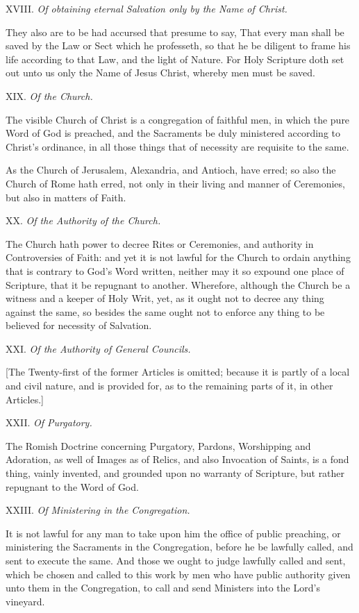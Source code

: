 XVIII.
\emph{Of obtaining eternal Salvation only by the Name of Christ.}

They
also are to be had accursed that presume to say, That every man shall
be saved by the Law or Sect which he professeth, so that he be diligent
to frame his life according to that Law, and the light of Nature. For
Holy Scripture doth set out unto us only the Name of Jesus Christ, whereby
men must be saved.

XIX. \emph{Of the Church.}

The
visible Church of Christ is a congregation of faithful men, in which the
pure Word of God is preached, and the Sacraments be duly ministered according
to Christ’s ordinance, in all those things that of necessity are
requisite to the same.

As the Church of Jerusalem, Alexandria, and Antioch,
have erred; so also the Church of Rome hath erred, not only in their living
and manner of Ceremonies, but also in matters of Faith.

XX. \emph{Of the Authority
of the Church.}

The
Church hath power to decree Rites or Ceremonies, and authority in Controversies
of Faith: and yet it is not lawful for the Church to ordain anything that
is contrary to God’s Word written, neither may it so expound one
place of Scripture, that it be repugnant to another. Wherefore, although
the Church be a witness and a keeper of Holy Writ, yet, as it ought not
to decree any thing against the same, so besides the same ought not to
enforce any thing to be believed for necessity of Salvation.

XXI.
\emph{Of the Authority of General Councils.}

[The
Twenty-first of the former Articles is omitted; because it is partly of
a local and civil nature, and is provided for, as to the remaining parts
of it, in other Articles.]

XXII. \emph{Of Purgatory.}

The
Romish Doctrine concerning Purgatory, Pardons, Worshipping and Adoration,
as well of Images as of Relics, and also Invocation of Saints, is a fond
thing, vainly invented, and grounded upon no warranty of Scripture, but
rather repugnant to the Word of God.

XXIII. \emph{Of Ministering
in the Congregation.}

It
is not lawful for any man to take upon him the office of public preaching,
or ministering the Sacraments in the Congregation, before he be lawfully
called, and sent to execute the same. And those we ought to judge lawfully
called and sent, which be chosen and called to this work by men who have
public authority given unto them in the Congregation, to call and send
Ministers into the Lord’s vineyard.

